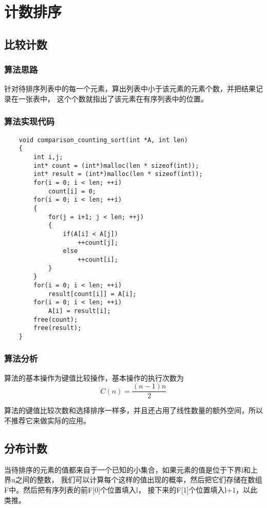 \documentclass[a4paper,left=2.5cm,right=2.5cm,11pt]{article}
\begin{document}
\tableofcontents

\clearpage

\section{计数排序}
\subsection{比较计数}
\subsubsection{算法思路}
	针对待排序列表中的每一个元素，算出列表中小于该元素的元素个数，并把结果记录在一张表中，
	这个个数就指出了该元素在有序列表中的位置。

\subsubsection{算法实现代码}
	\begin{lstlisting}
	void comparison_counting_sort(int *A, int len)
	{
		int i,j;
		int* count = (int*)malloc(len * sizeof(int));
		int* result = (int*)malloc(len * sizeof(int));
		for(i = 0; i < len; ++i)
			count[i] = 0;
		for(i = 0; i < len; ++i)
		{
			for(j = i+1; j < len; ++j)
			{
				if(A[i] < A[j])
					++count[j];
				else
					++count[i];
			}
		}
		for(i = 0; i < len; ++i)
			result[count[i]] = A[i];
		for(i = 0; i < len; ++i)
			A[i] = result[i];
		free(count);
		free(result);
	}
	\end{lstlisting}

\subsubsection{算法分析}
	算法的基本操作为键值比较操作，基本操作的执行次数为
	\begin{equation}
		C(n) = \frac{(n-1)n}{2}
	\end{equation}

	算法的键值比较次数和选择排序一样多，并且还占用了线性数量的额外空间，所以不推荐它来做实际的应用。

\subsection{分布计数}
	当待排序的元素的值都来自于一个已知的小集合，如果元素的值是位于下界l和上界u之间的整数，
	我们可以计算每个这样的值出现的概率，然后把它们存储在数组F中。然后把有序列表的前F[0]个位置填入l，
	接下来的F[1]个位置填入l+1，以此类推。
\end{document}
